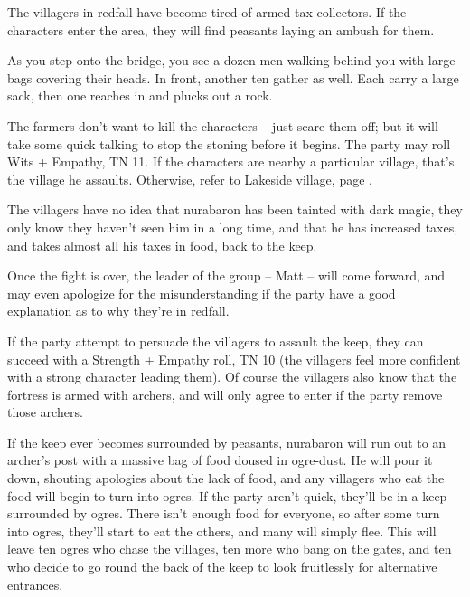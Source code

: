 \begin{multicols}{2}

\noindent The villagers in \gls{redfall} have become tired of armed tax collectors.  If the characters enter the area, they will find peasants laying an ambush for them.

\begin{boxtext}

	As you step onto the bridge, you see a dozen men walking behind you with large bags covering their heads.  In front, another ten gather as well.  Each carry a large sack, then one reaches in and plucks out a rock.

\end{boxtext}

The farmers don't want to kill the characters -- just scare them off; but it will take some quick talking to stop the stoning before it begins.  The party may roll Wits + Empathy, TN 11.
If the characters are nearby a particular village, that's the village he assaults.
Otherwise, refer to Lakeside village, page \pageref{lakeside}.

The villagers have no idea that \gls{nurabaron} has been tainted with dark magic, they only know they haven't seen him in a long time, and that he has increased taxes, and takes almost all his taxes in food, back to the keep.


Once the fight is over, the leader of the group -- Matt -- will come forward, and may even apologize for the misunderstanding if the party have a good explanation as to why they're in \gls{redfall}.

If the party attempt to persuade the villagers to assault the keep, they can succeed with a Strength + Empathy roll, TN 10
(the villagers feel more confident with a strong character leading them).
Of course the villagers also know that the fortress is armed with archers, and will only agree to enter if the party remove those archers.

If the keep ever becomes surrounded by peasants, \gls{nurabaron} will run out to an archer's post with a massive bag of food doused in ogre-dust.
He will pour it down, shouting apologies about the lack of food, and any villagers who eat the food will begin to turn into ogres.
If the party aren't quick, they'll be in a keep surrounded by ogres.
There isn't enough food for everyone, so after some turn into ogres, they'll start to eat the others, and many will simply flee.
This will leave ten ogres who chase the villages, ten more who bang on the gates, and ten who decide to go round the back of the keep to look fruitlessly for alternative entrances.


\end{multicols}
